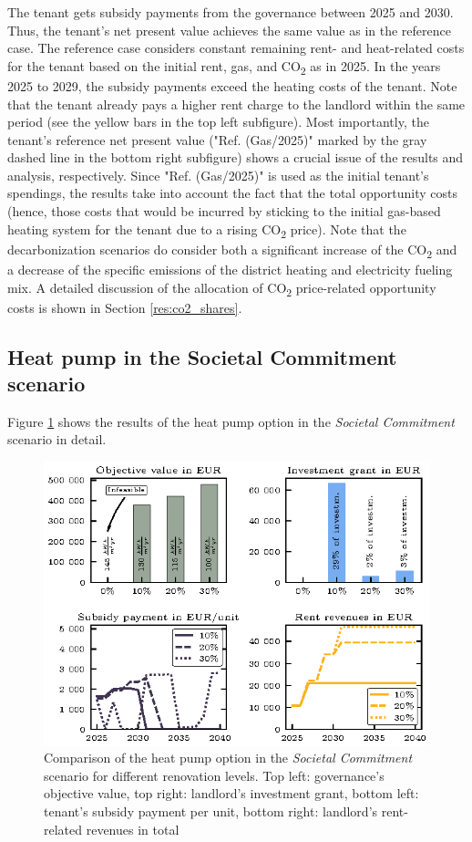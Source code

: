  The tenant gets subsidy payments from the governance between 2025 and 2030. Thus, the tenant's net present value achieves the same value as in the reference case. The reference case considers constant remaining rent- and heat-related costs for the tenant based on the initial rent, gas, and CO\textsubscript{2} as in 2025. In the years 2025 to 2029, the subsidy payments exceed the heating costs of the tenant. Note that the tenant already pays a higher rent charge to the landlord within the same period (see the yellow bars in the top left subfigure). Most importantly, the tenant's reference net present value ("Ref. (Gas/2025)" marked by the gray dashed line in the bottom right subfigure) shows a crucial issue of the results and analysis, respectively. Since "Ref. (Gas/2025)" is used as the initial tenant's spendings, the results take into account the fact that the total opportunity costs (hence, those costs that would be incurred by sticking to the initial gas-based heating system for the tenant due to a rising CO\textsubscript{2} price). Note that the decarbonization scenarios do consider both a significant increase of the CO\textsubscript{2} and a decrease of the specific emissions of the district heating and electricity fueling mix. A detailed discussion of the allocation of CO\textsubscript{2} price-related opportunity costs is shown in Section \ref{res:co2_shares}.

\subsection{Heat pump in the Societal Commitment scenario}\label{res:heat_pump}
Figure \ref{fig:retrofitting} shows the results of the heat pump option in the \textit{Societal Commitment} scenario in detail. 

\begin{figure}[h]
	\centering
	\includegraphics[width=1\linewidth]{figures/4_Results/fig_retrofitting/retrofitting.eps}
	\caption{Comparison of the heat pump option in the \textit{Societal Commitment} scenario for different renovation levels. Top left: governance's objective value, top right: landlord's investment grant, bottom left: tenant's subsidy payment per unit, bottom right: landlord's rent-related revenues in total}
	\label{fig:retrofitting}
\end{figure}

